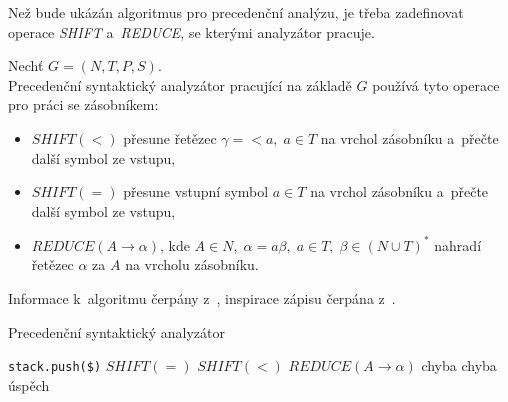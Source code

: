Než bude ukázán algoritmus pro precedenční analýzu, je třeba zadefinovat operace \emph{SHIFT} a~\emph{REDUCE}, se kterými analyzátor pracuje.
\begin{definition}
    Nechť $G = (N, T, P, S)$.\\
    Precedenční syntaktický analyzátor pracující na základě $G$ používá tyto operace pro práci se zásobníkem:
    \begin{itemize}
        \item $SHIFT(<)$ přesune řetězec $\gamma = <a,\; a \in T$ na vrchol zásobníku a~přečte další symbol ze vstupu,
        \item $SHIFT(=)$ přesune vstupní symbol $a \in T$ na vrchol zásobníku a~přečte další symbol ze vstupu,
        \item $REDUCE(A \rightarrow \alpha)$, kde $A \in N,\; \alpha = a\beta,\; a \in T,\; \beta \in (N \cup T)^*$ nahradí řetězec $\alpha$ za $A$ na vrcholu zásobníku.
    \end{itemize}
\end{definition}
Informace k~algoritmu čerpány z~\cite{medunaElementsOfCompDesign,meduna2017sa-zdola-nahoru}, inspirace zápisu čerpána z~\cite{kunda2022}.
\begin{algorithm}[h]
    \caption{Precedenční syntaktický analyzátor}
    \label{alg_precedencni_sa}
    \begin{algorithmic}[1]
        \NewLine
        \State \texttt{stack.push(\$)}
        \Repeat
                \Case{$=$}
                    \State $SHIFT(=)$
                \EndCase
                \Case{$<$}
                    \State $SHIFT(<)$
                \EndCase
                \Case{$>$}
                        \State $REDUCE(A \rightarrow \alpha)$
                    \Else
                        \State chyba 
                    \EndIf
                \EndCase
                \Case{$\times$}
                    \State chyba 
                \EndCase
                \Case{\checkmark}
                    \State úspěch
                \EndCase
            \EndSwitch
    \end{algorithmic}
\end{algorithm}

